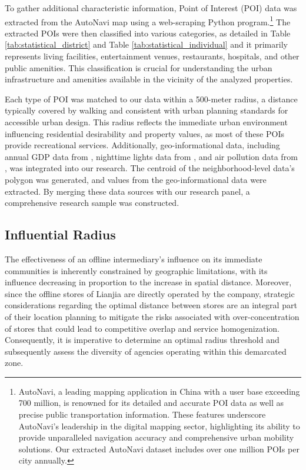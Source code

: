 \documentclass[11pt]{article}
\begin{document}
To gather additional characteristic information, Point of Interest (POI) data was extracted from the AutoNavi map using a web-scraping Python program.\footnote{AutoNavi, a leading mapping application in China with a user base exceeding 700 million, is renowned for its detailed and accurate POI data as well as precise public transportation information. These features underscore AutoNavi's leadership in the digital mapping sector, highlighting its ability to provide unparalleled navigation accuracy and comprehensive urban mobility solutions. Our extracted AutoNavi dataset includes over one million POIs per city annually.} The extracted POIs were then classified into various categories, as detailed in Table \ref{tab:statistical_district} and Table \ref{tab:statistical_individual} and it primarily represents living facilities, entertainment venues, restaurants, hospitals, and other public amenities. This classification is crucial for understanding the urban infrastructure and amenities available in the vicinity of the analyzed properties.

Each type of POI was matched to our data within a 500-meter radius, a distance typically covered by walking and consistent with urban planning standards for accessible urban design. This radius reflects the immediate urban environment influencing residential desirability and property values, as most of these POIs provide recreational services. Additionally, geo-informational data, including annual GDP data from \citet{zhao_forecasting_2017}, nighttime lights data from \citet{elvidge_annual_2021}, and air pollution data from \citet{doi:10.1021/acs.est.1c05309}, was integrated into our research. The centroid of the neighborhood-level data's polygon was generated, and values from the geo-informational data were extracted. By merging these data sources with our research panel, a comprehensive research sample was constructed.

\subsection{Influential Radius} \label{subsec:Influential_Radius}

The effectiveness of an offline intermediary's influence on its immediate communities is inherently constrained by geographic limitations, with its influence decreasing in proportion to the increase in spatial distance. Moreover, since the offline stores of Lianjia are directly operated by the company, strategic considerations regarding the optimal distance between stores are an integral part of their location planning to mitigate the risks associated with over-concentration of stores that could lead to competitive overlap and service homogenization. Consequently, it is imperative to determine an optimal radius threshold and subsequently assess the diversity of agencies operating within this demarcated zone.
\end{document}
